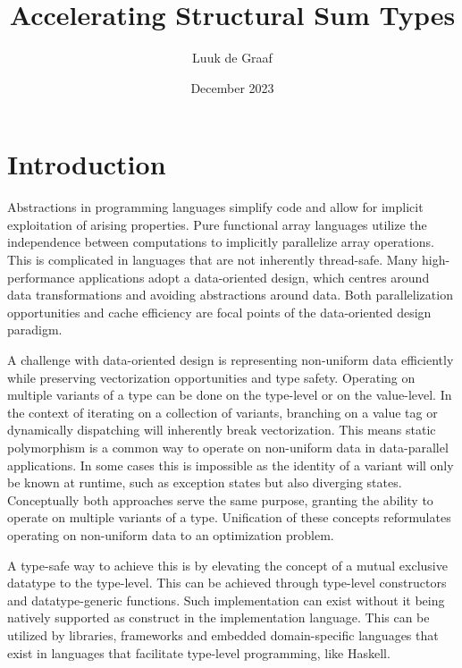 \documentclass{article}
\title{Accelerating Structural Sum Types}
\author{Luuk de Graaf}
\date{December 2023}
\begin{document}
\maketitle

\tableofcontents

\newpage

\section{Introduction}

Abstractions in programming languages simplify code and allow for implicit exploitation of arising properties.
Pure functional array languages utilize the independence between computations to implicitly parallelize array operations.
This is complicated in languages that are not inherently thread-safe.
Many high-performance applications adopt a data-oriented design, which centres around data transformations and avoiding abstractions around data. 
Both parallelization opportunities and cache efficiency are focal points of the data-oriented design paradigm.

A challenge with data-oriented design is representing non-uniform data efficiently while preserving vectorization opportunities and type safety. 
Operating on multiple variants of a type can be done on the type-level or on the value-level.
In the context of iterating on a collection of variants, branching on a value tag or dynamically dispatching will inherently break vectorization.
This means static polymorphism is a common way to operate on non-uniform data in data-parallel applications.
In some cases this is impossible as the identity of a variant will only be known at runtime, such as exception states but also diverging states.
Conceptually both approaches serve the same purpose, granting the ability to operate on multiple variants of a type.
Unification of these concepts reformulates operating on non-uniform data to an optimization problem.

A type-safe way to achieve this is by elevating the concept of a mutual exclusive datatype to the type-level.
This can be achieved through type-level constructors and datatype-generic functions.
Such implementation can exist without it being natively supported as construct in the implementation language.
This can be utilized by libraries, frameworks and embedded domain-specific languages that exist in languages that facilitate type-level programming, like Haskell.

\newpage
\end{document}
